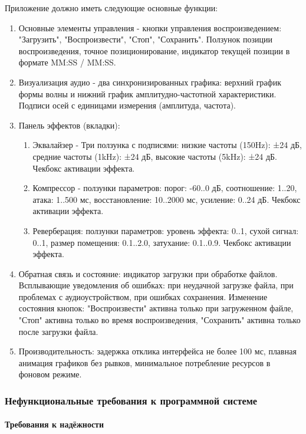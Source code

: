 Приложение должно иметь следующие основные функции:
\begin{enumerate}
	\item Основные элементы управления - кнопки управления воспроизведением: "Загрузить", "Воспроизвести", "Стоп", "Сохранить". Ползунок позиции воспроизведения, точное позиционирование, индикатор текущей позиции в формате MM:SS / MM:SS.
	\item Визуализация аудио - два синхронизированных графика: верхний график формы волны и нижний график амплитудно-частотной характеристики. Подписи осей с единицами измерения (амплитуда, частота).
	\item Панель эффектов (вкладки):
	\begin{enumerate}
		\item Эквалайзер - Три ползунка с подписями: низкие частоты (150Hz): ±24 дБ, средние частоты (1kHz): ±24 дБ, высокие частоты (5kHz): ±24 дБ. Чекбокс активации эффекта.
		\item Компрессор - ползунки параметров: порог: -60..0 дБ, соотношение: 1..20, атака: 1..500 мс, восстановление: 10..2000 мс, усиление: 0..24 дБ. Чекбокс активации эффекта.
		\item Реверберация: ползунки параметров: уровень эффекта: 0..1, сухой сигнал: 0..1, размер помещения: 0.1..2.0, затухание: 0.1..0.9. Чекбокс активации эффекта.
	\end{enumerate}	
	\item Обратная связь и состояние: индикатор загрузки при обработке файлов. Всплывающие уведомления об ошибках: при неудачной загрузке файла, при проблемах с аудиоустройством, при ошибках сохранения. Изменение состояния кнопок: "Воспроизвести" активна только при загруженном файле, "Стоп" активна только во время воспроизведения, "Сохранить" активна только после загрузки файла.
	\item Производительность: задержка отклика интерфейса не более 100 мс, плавная анимация графиков без рывков, минимальное потребление ресурсов в фоновом режиме.
\end{enumerate}	

\subsubsection{Нефункциональные требования к программной системе}

\paragraph{Требования к надёжности}

